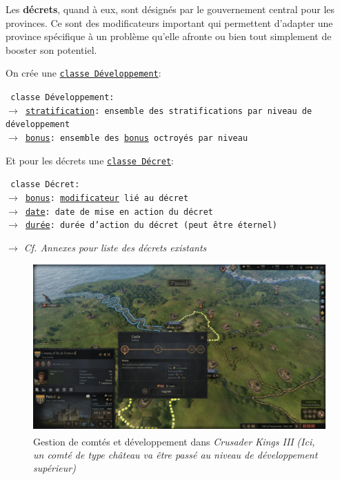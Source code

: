 \documentclass{article}
\newcommand{\ulcolor}[2][class]{\setulcolor{#1}\ul{#2}}
\newcommand{\ulcolor}[2][var]{\setulcolor{#1}\ul{#2}}
\newcommand{\ulcolor}[2][func]{\setulcolor{#1}\ul{#2}}
\newcommand*{\mybox}[2]{\colorbox{#1!30}{\parbox{.98\linewidth}{#2}}}
\newcommand\tab[1][0.5cm]{\hspace*{#1}}
\newcommand{\genbox}[1]{\mybox{verylightgray}{#1}}
\newcommand{\classbox}[1]{\mybox{palegreen}{\texttt{\textcolor{codeColour}{#1}}}}
\newcommand{\class}[1]{\texttt{\textcolor{codeColour}{\ulcolor[class]{#1}}}}
\newcommand{\var}[1]{\texttt{\textcolor{codeColour}{\ulcolor[var]{#1}}}}
\def\reg{\small{\textsuperscript{\textregistered}}}
\begin{document}
                Les \textbf{décrets}, quand à eux, sont désignés par le gouvernement central pour les provinces. Ce sont des modificateurs important qui permettent d'adapter une province spécifique à un problème qu'elle afronte ou bien tout simplement de booster son potentiel.

                \tab \genbox{
                    On crée une \class{classe D\'eveloppement}: \\
                    \tab \classbox{
                        classe Développement: \\
                            $\rightarrow$ \var{stratification}: ensemble des stratifications par niveau de développement \\
                            $\rightarrow$ \var{bonus}: ensemble des \class{bonus} octroyés par niveau \\
                    } 
                    Et pour les décrets une \class{classe D\'ecret}: \\
                    \tab \classbox{
                        classe Décret: \\
                            $\rightarrow$ \var{bonus}: \class{modificateur} lié au décret \\
                            $\rightarrow$ \var{date}: date de mise en action du décret \\
                            $\rightarrow$ \var{dur\'ee}: durée d'action du décret (peut être éternel) \\ 
                    } 
                }

                \textit{$\rightarrow$ Cf. Annexes pour liste des décrets existants}
                
                \begin{figure}[h]
                    \centering
                        \includegraphics[scale=0.2]{image_ck3_developpement.png}
                        \caption{Gestion de comtés et développement dans \textit{Crusader Kings III\reg} \textit{(Ici, un comté de type château va être passé au niveau de développement supérieur)}}
                        \label{fig:x photosysteme}
                \end{figure}
            
\end{document}
